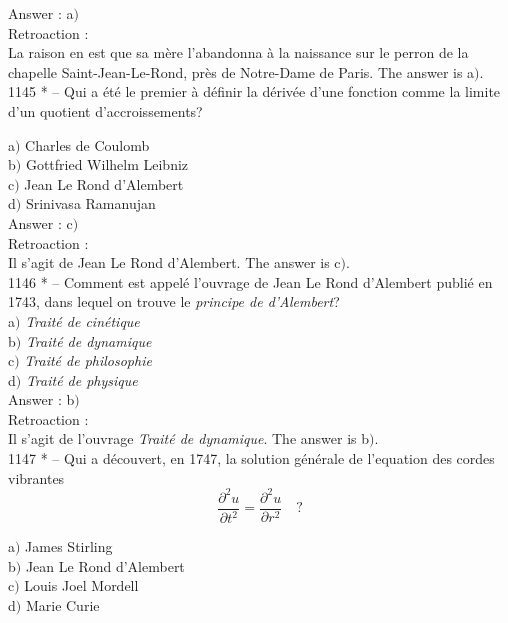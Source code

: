 ﻿\documentclass[letterpaper, 12pt]{article}
\begin{document}
Answer : a$)$\\

Retroaction : \\
La raison en est que sa m\`ere l'abandonna \`a la naissance sur le
perron de la chapelle Saint-Jean-Le-Rond, pr\`es de
Notre-Dame de Paris. The answer is a$)$. \\

1145 * -- Qui a \'et\'e le premier \`a d\'efinir la d\'eriv\'ee
d'une fonction comme la limite d'un quotient d'accroissements?

a$)$ Charles de Coulomb \\
b$)$ Gottfried Wilhelm Leibniz \\
c$)$ Jean Le Rond d'Alembert \\
d$)$ Srinivasa Ramanujan  \\

Answer : c$)$\\

Retroaction : \\
Il s'agit de Jean Le Rond d'Alembert. The answer is c$)$. \\

1146 * -- Comment est appel\'e l'ouvrage de Jean Le Rond d'Alembert publi\'e
en 1743, dans lequel on trouve
le {\sl principe de d'Alembert}?\\

a$)$ {\sl Trait\'e de cin\'etique}  \\
b$)$ {\sl Trait\'e de dynamique} \\
c$)$ {\sl Trait\'e de philosophie}  \\
d$)$ {\sl Trait\'e de physique}  \\

Answer : b$)$\\

Retroaction : \\
Il s'agit de l'ouvrage {\sl Trait\'e de dynamique}. The answer is b$)$.
\\

1147 * -- Qui a d\'ecouvert, en 1747, la solution g\'en\'erale de
l'equation des cordes vibrantes
$$\displaystyle{\frac{\partial^2u}{\partial t^2}=\frac{\partial^2u}{\partial
r^2}}\quad?$$

a$)$ James Stirling \\
b$)$ Jean Le Rond d'Alembert \\
c$)$ Louis Joel Mordell  \\
d$)$ Marie Curie  \\
\end{document}
